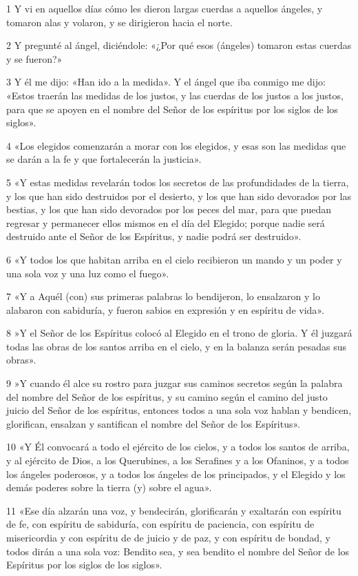 \par 1 Y vi en aquellos días cómo les dieron largas cuerdas a aquellos ángeles, y tomaron alas y volaron, y se dirigieron hacia el norte.
\par 2 Y pregunté al ángel, diciéndole: «¿Por qué esos (ángeles) tomaron estas cuerdas y se fueron?»
\par 3 Y él me dijo: «Han ido a la medida». Y el ángel que iba conmigo me dijo: «Estos traerán las medidas de los justos, y las cuerdas de los justos a los justos, para que se apoyen en el nombre del Señor de los espíritus por los siglos de los siglos».
\par 4 «Los elegidos comenzarán a morar con los elegidos, y esas son las medidas que se darán a la fe y que fortalecerán la justicia».
\par 5 «Y estas medidas revelarán todos los secretos de las profundidades de la tierra, y los que han sido destruidos por el desierto, y los que han sido devorados por las bestias, y los que han sido devorados por los peces del mar, para que puedan regresar y permanecer ellos mismos en el día del Elegido; porque nadie será destruido ante el Señor de los Espíritus, y nadie podrá ser destruido».
\par 6 «Y todos los que habitan arriba en el cielo recibieron un mando y un poder y una sola voz y una luz como el fuego».
\par 7 «Y a Aquél (con) sus primeras palabras lo bendijeron, lo ensalzaron y lo alabaron con sabiduría, y fueron sabios en expresión y en espíritu de vida».
\par 8 »Y el Señor de los Espíritus colocó al Elegido en el trono de gloria. Y él juzgará todas las obras de los santos arriba en el cielo, y en la balanza serán pesadas sus obras».
\par 9 »Y cuando él alce su rostro para juzgar sus caminos secretos según la palabra del nombre del Señor de los espíritus, y su camino según el camino del justo juicio del Señor de los espíritus, entonces todos a una sola voz hablan y bendicen, glorifican, ensalzan y santifican el nombre del Señor de los Espíritus».
\par 10 «Y Él convocará a todo el ejército de los cielos, y a todos los santos de arriba, y al ejército de Dios, a los Querubines, a los Serafines y a los Ofaninos, y a todos los ángeles poderosos, y a todos los ángeles de los principados, y el Elegido y los demás poderes sobre la tierra (y) sobre el agua».
\par 11 «Ese día alzarán una voz, y bendecirán, glorificarán y exaltarán con espíritu de fe, con espíritu de sabiduría, con espíritu de paciencia, con espíritu de misericordia y con espíritu de de juicio y de paz, y con espíritu de bondad, y todos dirán a una sola voz: Bendito sea, y sea bendito el nombre del Señor de los Espíritus por los siglos de los siglos».
